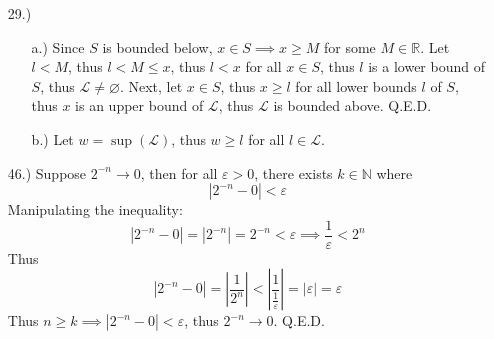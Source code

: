 \documentclass[12pt]{article}
\newcommand{\vertb}[1]{\left\vert#1\right\vert}
\newcommand{\e}{\varepsilon}
\begin{document}
\pagestyle{fancy}
\fancyhead{}

\normalsize
\begin{itemize}

    \item [29.)] \begin{itemize}
        \item [a.)] Since $S$ is bounded below, $x\in S\implies x\geq M$ for some $M\in\mathbb{R}$. Let $l<M$, thus $l<M\leq x$, thus $l<x$ for all $x\in S$, thus $l$ is a lower bound of $S$, thus $\mathscr{L}\ne\varnothing$. Next, let $x\in S$, thus $x\geq l$ for all lower bounds $l$ of $S$, thus $x$ is an upper bound of $\mathscr{L}$, thus $\mathscr{L}$ is bounded above. Q.E.D.

        \item [b.)] Let $w=\sup(\mathscr{L})$, thus $w\geq l$ for all $l\in\mathscr{L}$.
    \end{itemize}





    \item [46.)] Suppose $2^{-n}\to0$, then for all $\e>0$, there exists $k\in\mathbb{N}$ where
    \[\vertb{2^{-n}-0}<\e\]
    Manipulating the inequality:
    \[\vertb{2^{-n}-0}=\vertb{2^{-n}}=2^{-n}<\e\implies\frac{1}{\e}<2^n\]
    Thus
    \[\vertb{2^{-n}-0}=\vertb{\frac{1}{2^n}}<\vertb{\frac{1}{\frac{1}{\e}}}=\vertb{\e}=\e\]
    Thus $n\geq k\implies\vertb{2^{-n}-0}<\e$, thus $2^{-n}\to0$. Q.E.D.


\end{itemize}
\end{document}
